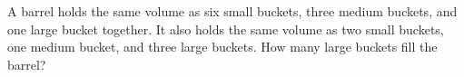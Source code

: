 A barrel holds the same volume as six small buckets, three medium buckets, and one large bucket together. It also holds the same volume as two small buckets, one medium bucket, and three large buckets. How many large buckets fill the barrel?
